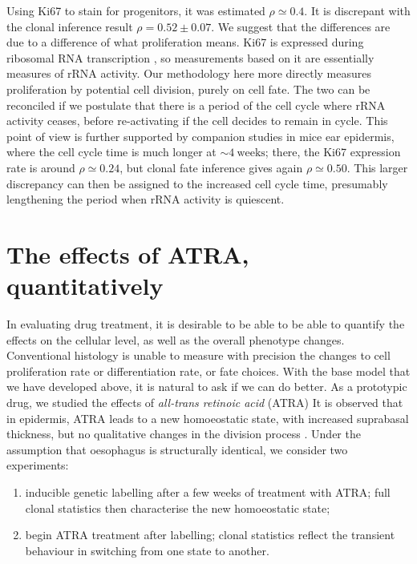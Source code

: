 \documentclass[10pt,english]{report}
\begin{document}
Using Ki67 to stain for progenitors, it was estimated $\rho \simeq 0.4$. It is discrepant with the clonal inference result $\rho = 0.52 \pm 0.07$. We suggest that the differences are due to a difference of what proliferation means. Ki67 is expressed during ribosomal RNA transcription \citep{ki67rRNA}, so measurements based on it are essentially measures of rRNA activity. Our methodology here more directly measures proliferation by potential cell division, purely on cell fate. The two can be reconciled if we postulate that there is a period of the cell cycle where rRNA activity ceases, before re-activating if the cell decides to remain in cycle. This point of view is further supported by companion studies in mice ear epidermis, where the cell cycle time is much longer at $\sim 4~\textrm{weeks}$; there, the Ki67 expression rate is around $\rho \simeq 0.24$, but clonal fate inference gives again $\rho \simeq 0.50$. This larger discrepancy can then be assigned to the increased cell cycle time, presumably lengthening the period when rRNA activity is quiescent.

\section{\label{sec:atra}The effects of ATRA, quantitatively}

In evaluating drug treatment, it is desirable to be able to be able to quantify the effects on the cellular level, as well as the overall phenotype changes. Conventional histology is unable to measure with precision the changes to cell proliferation rate or differentiation rate, or fate choices. With the base model that we have developed above, it is natural to ask if we can do better. As a prototypic drug, we studied the effects of \emph{all-trans retinoic acid} (ATRA) It is observed that in epidermis, ATRA leads to a new homoeostatic state, with increased suprabasal thickness, but no qualitative changes in the division process \citep{atraqualitative}. Under the assumption that oesophagus is structurally identical, we consider two experiments:

\begin{enumerate}
\item inducible genetic labelling after a few weeks of treatment with ATRA; full clonal statistics then characterise the new homoeostatic state;
\item begin ATRA treatment after labelling; clonal statistics reflect the transient behaviour in switching from one state to another.
\end{enumerate}
\end{document}
